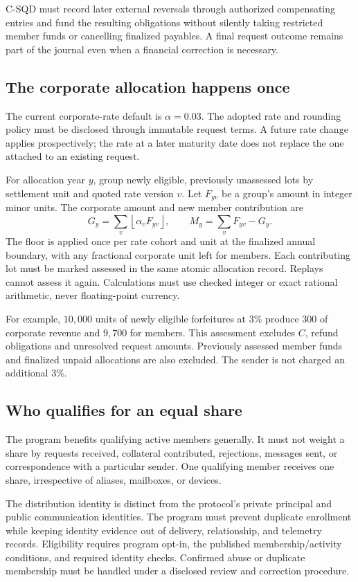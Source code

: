 \documentclass[11pt]{article}
\begin{document}
C-SQD must record later external reversals through authorized compensating
entries and fund the resulting obligations without silently taking restricted
member funds or cancelling finalized payables. A final request outcome remains
part of the journal even when a financial correction is necessary.

\subsection{The corporate allocation happens once}

The current corporate-rate default is $\alpha=0.03$. The adopted rate and rounding
policy must be disclosed through immutable request terms. A future rate change
applies prospectively; the rate at a later maturity date does not replace the
one attached to an existing request.

For allocation year $y$, group newly eligible, previously unassessed lots by settlement
unit and quoted rate version $v$. Let $F_{yv}$ be a group's amount in integer
minor units. The corporate amount and new member contribution are
\[
G_y=\sum_v\left\lfloor\alpha_v F_{yv}\right\rfloor,
\qquad M_y=\sum_v F_{yv}-G_y.
\]
The floor is applied once per rate cohort and unit at the finalized annual
boundary, with any fractional corporate unit left for members. Each contributing
lot must be marked assessed in the same atomic allocation record. Replays cannot
assess it again. Calculations must use checked integer or exact rational
arithmetic, never floating-point currency.

For example, $10{,}000$ units of newly eligible forfeitures at 3\% produce $300$
of corporate revenue and $9{,}700$ for members. This assessment excludes $C$,
refund obligations and unresolved request amounts. Previously assessed member funds and finalized unpaid allocations are
also excluded. The sender is not charged an additional 3\%.

\subsection{Who qualifies for an equal share}

The program benefits qualifying active members generally. It must not weight a
share by requests received, collateral contributed, rejections, messages sent,
or correspondence with a particular sender. One qualifying member receives one
share, irrespective of aliases, mailboxes, or devices.

The distribution identity is distinct from the protocol's private principal and
public communication identities. The program must prevent duplicate enrollment
while keeping identity evidence out of delivery, relationship, and telemetry
records. Eligibility requires program opt-in, the published membership/activity
conditions, and required identity checks. Confirmed abuse or duplicate membership
must be handled under a disclosed review and correction procedure.
\end{document}
